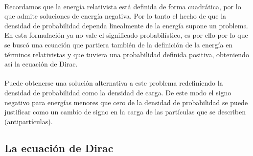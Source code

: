 \documentclass[11pt,letterpaper]{article}     %
\begin{document}
\\Recordamos que la energía relativista está definida de forma cuadrática, por lo que admite soluciones de energía negativa. Por lo tanto el hecho de que la densidad de probabilidad dependa linealmente de la energía supone un problema. En esta formulación ya no vale el significado probabilístico, es por ello por lo que se buscó una ecuación que partiera también de la definición de la energía en términos relativistas y que tuviera una probabilidad definida positiva, obteniendo así la ecuación de Dirac. \\
\\Puede obtenerse una solución alternativa a este problema redefiniendo la densidad de probabilidad como la densidad de carga. De este modo el signo negativo para energías menores que cero de la densidad de probabilidad se puede justificar como un cambio de signo en la carga de las partículas que se describen (antipartículas).




\subsection{La ecuación de Dirac}
\end{document}
